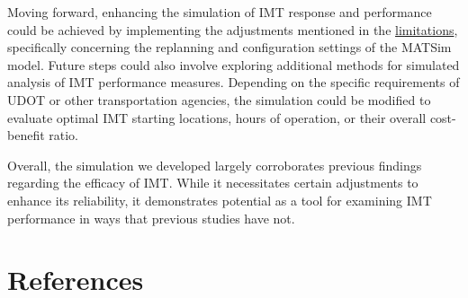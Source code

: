 \documentclass[fancy, oneside, mastersfancy, ms]{byuthesis}
\begin{document}
Moving forward, enhancing the simulation of IMT response and performance
could be achieved by implementing the adjustments mentioned in the
\protect\hyperlink{sec-limitations}{limitations}, specifically
concerning the replanning and configuration settings of the MATSim
model. Future steps could also involve exploring additional methods for
simulated analysis of IMT performance measures. Depending on the
specific requirements of UDOT or other transportation agencies, the
simulation could be modified to evaluate optimal IMT starting locations,
hours of operation, or their overall cost-benefit ratio.

Overall, the simulation we developed largely corroborates previous
findings regarding the efficacy of IMT. While it necessitates certain
adjustments to enhance its reliability, it demonstrates potential as a
tool for examining IMT performance in ways that previous studies have
not.


\hypertarget{references}{%
\chapter*{References}\label{references}}

\end{document}

